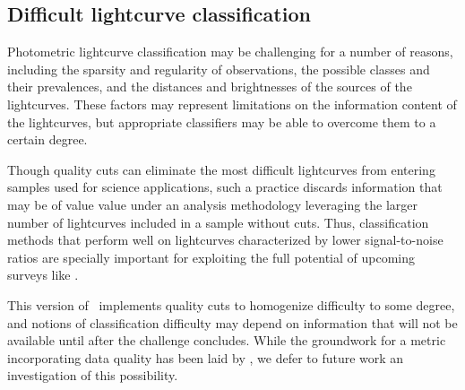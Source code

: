 %

\subsection{Difficult lightcurve classification}
\label{sec:difficult}

Photometric lightcurve classification may be challenging for a number of reasons, including the sparsity and regularity of observations, the possible classes and their prevalences, and the distances and brightnesses of the sources of the lightcurves.
These factors may represent limitations on the information content of the lightcurves, but appropriate classifiers may be able to overcome them to a certain degree.

Though quality cuts can eliminate the most difficult lightcurves from entering samples used for science applications, such a practice discards information that may be of value value under an analysis methodology leveraging the larger number of lightcurves included in a sample without cuts.
Thus, classification methods that perform well on lightcurves characterized by lower signal-to-noise ratios are specially important for exploiting the full potential of upcoming surveys like \lsst.

This version of \plasticc\ implements quality cuts to homogenize difficulty to some degree, and notions of classification difficulty may depend on information that will not be available until after the challenge concludes.
While the groundwork for a metric incorporating data quality has been laid by \citet{wu_radio_2018}, we defer to future work an investigation of this possibility.
